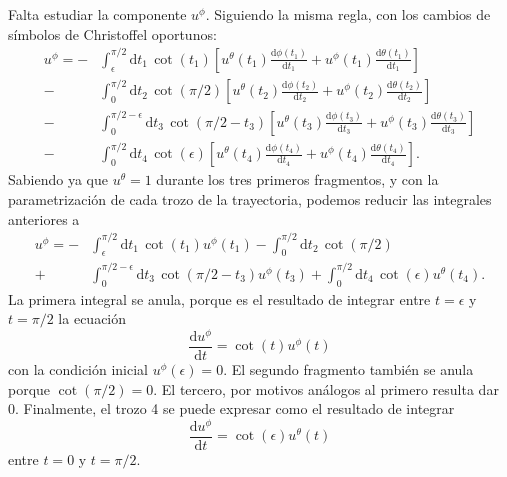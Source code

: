 \begin{example}
    Falta estudiar la componente \(u^\phi\). Siguiendo la misma regla, con los cambios de símbolos de Christoffel oportunos:
    \begin{align*}
        u^\phi = -&\int_\epsilon^{\pi/2} \mathrm{d}t_1\, \cot(t_1) \left[u^\theta(t_1) \frac{\mathrm{d}\phi(t_1)}{\mathrm{d}t_1} + u^\phi(t_1) \frac{\mathrm{d}\theta(t_1)}{\mathrm{d}t_1}\right] \\
        - &\int_0^{\pi/2} \mathrm{d}t_2\, \cot(\pi/2) \left[u^\theta(t_2) \frac{\mathrm{d}\phi(t_2)}{\mathrm{d}t_2} + u^\phi(t_2) \frac{\mathrm{d}\theta(t_2)}{\mathrm{d}t_2}\right]\\
        - &\int_0^{\pi/2-\epsilon} \mathrm{d}t_3\, \cot(\pi/2-t_3) \left[u^\theta(t_3) \frac{\mathrm{d}\phi(t_3)}{\mathrm{d}t_3} + u^\phi(t_3) \frac{\mathrm{d}\theta(t_3)}{\mathrm{d}t_3}\right]\\
        - &\int_0^{\pi/2} \mathrm{d}t_4\, \cot(\epsilon) \left[u^\theta(t_4) \frac{\mathrm{d}\phi(t_4)}{\mathrm{d}t_4} + u^\phi(t_4) \frac{\mathrm{d}\theta(t_4)}{\mathrm{d}t_4}\right].
    \end{align*}
    Sabiendo ya que \(u^\theta = 1\) durante los tres primeros fragmentos, y con la parametrización de cada trozo de la trayectoria, podemos reducir las integrales anteriores a
    \begin{align*}
        u^\phi = -&\int_\epsilon^{\pi/2} \mathrm{d}t_1\, \cot(t_1) u^\phi(t_1) - \int_0^{\pi/2} \mathrm{d}t_2\, \cot(\pi/2) \\
        + &\int_0^{\pi/2-\epsilon} \mathrm{d}t_3\, \cot(\pi/2-t_3) u^\phi(t_3) + \int_0^{\pi/2} \mathrm{d}t_4\, \cot(\epsilon) u^\theta(t_4).
    \end{align*}
    La primera integral se anula, porque es el resultado de integrar entre \(t=\epsilon\) y \(t=\pi/2\) la ecuación
    \begin{equation*}
        \frac{\mathrm{d}u^\phi}{\mathrm{d}t} = \cot(t)u^\phi(t)
    \end{equation*}
    con la condición inicial \(u^\phi(\epsilon) = 0\). El segundo fragmento también se anula porque \(\cot(\pi/2) = 0\). El tercero, por motivos análogos al primero resulta dar 0. Finalmente, el trozo 4 se puede expresar como el resultado de integrar
    \begin{equation}
        \label{eq.4-exampleb}
        \frac{\mathrm{d}u^\phi}{\mathrm{d}t} = \cot(\epsilon) u^\theta(t)
    \end{equation}
    entre \(t = 0\) y \(t=\pi/2\). 
    

\end{example}
